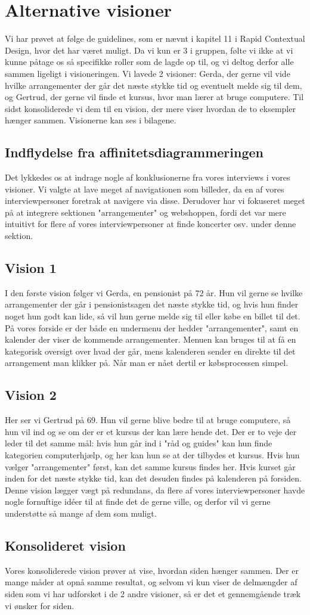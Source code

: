 \section{Alternative visioner}
Vi har prøvet at følge de guidelines, som er nævnt i kapitel 11 i Rapid Contextual Design, hvor det har været muligt.
Da vi kun er 3 i gruppen, følte vi ikke at vi kunne påtage os så specifikke roller som de lagde op til, og vi deltog derfor
alle sammen ligeligt i visioneringen. Vi lavede 2 visioner: Gerda, der gerne vil vide hvilke arrangementer der går det næste stykke tid
og eventuelt melde sig til dem, og Gertrud, der gerne vil finde et kursus, hvor man lærer at bruge computere. Til sidst konsoliderede vi dem
til en vision, der mere viser hvordan de to eksempler hænger sammen. Visionerne kan ses i bilagene.

\subsection{Indflydelse fra affinitetsdiagrammeringen}
Det lykkedes os at indrage nogle af konklusionerne fra vores interviews i vores visioner. Vi valgte at lave meget af navigationen som billeder, da 
en af vores interviewpersoner foretrak at navigere via disse. Derudover har vi fokuseret meget på at integrere sektionen "arrangementer" og webshoppen,
fordi det var mere intuitivt for flere af vores interviewpersoner at finde koncerter osv. under denne sektion. 


\subsection{Vision 1}
I den første vision følger vi Gerda, en pensionist på 72 år. Hun vil gerne se hvilke arrangementer der går i pensionistsagen det næste stykke tid, og hvis hun finder noget hun godt kan lide, så vil hun gerne melde sig til eller købe en billet til det. På vores forside er der både en undermenu der hedder "arrangementer", samt en kalender der viser de kommende arrangementer. Menuen kan bruges til at få en kategorisk oversigt over hvad der går, mens kalenderen sender en direkte til det arrangement man klikker på. Når man er nået dertil er købsprocessen simpel.

\subsection{Vision 2}
Her ser vi Gertrud på 69. Hun vil gerne blive bedre til at bruge computere, så hun vil ind og se om der er et kursus der kan lære hende det. Der er to veje der leder til det samme mål: hvis hun går ind i "råd og guides" kan hun finde kategorien computerhjælp, og her kan hun se at der tilbydes et kursus. Hvis hun vælger "arrangementer" først, kan det samme kursus findes her. Hvis kurset går inden for det næste stykke tid, kan det desuden findes på kalenderen på forsiden. Denne vision lægger vægt på redundans, da flere af vores interviewpersoner havde nogle fornuftige idéer til at finde det de gerne ville, og derfor vil vi gerne understøtte så mange af dem som muligt.

\subsection{Konsolideret vision}
Vores konsoliderede vision prøver at vise, hvordan siden hænger sammen. Der er mange måder at opnå samme resultat, og selvom vi kun viser de delmængder af siden som vi har udforsket i de 2 andre visioner, så er det et gennemgående træk vi ønsker for siden.
